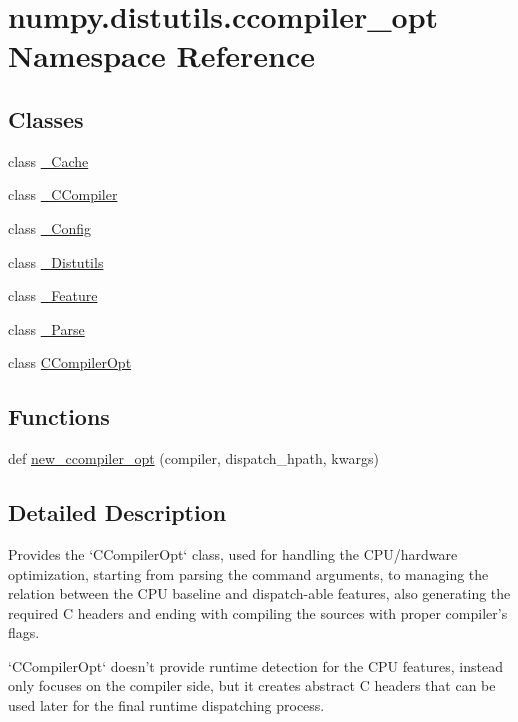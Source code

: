 \hypertarget{namespacenumpy_1_1distutils_1_1ccompiler__opt}{}\section{numpy.\+distutils.\+ccompiler\+\_\+opt Namespace Reference}
\label{namespacenumpy_1_1distutils_1_1ccompiler__opt}
\subsection*{Classes}
\begin{DoxyCompactItemize}
\item 
class \hyperlink{classnumpy_1_1distutils_1_1ccompiler__opt_1_1__Cache}{\+\_\+\+Cache}
\item 
class \hyperlink{classnumpy_1_1distutils_1_1ccompiler__opt_1_1__CCompiler}{\+\_\+\+C\+Compiler}
\item 
class \hyperlink{classnumpy_1_1distutils_1_1ccompiler__opt_1_1__Config}{\+\_\+\+Config}
\item 
class \hyperlink{classnumpy_1_1distutils_1_1ccompiler__opt_1_1__Distutils}{\+\_\+\+Distutils}
\item 
class \hyperlink{classnumpy_1_1distutils_1_1ccompiler__opt_1_1__Feature}{\+\_\+\+Feature}
\item 
class \hyperlink{classnumpy_1_1distutils_1_1ccompiler__opt_1_1__Parse}{\+\_\+\+Parse}
\item 
class \hyperlink{classnumpy_1_1distutils_1_1ccompiler__opt_1_1CCompilerOpt}{C\+Compiler\+Opt}
\end{DoxyCompactItemize}
\subsection*{Functions}
\begin{DoxyCompactItemize}
\item 
def \hyperlink{namespacenumpy_1_1distutils_1_1ccompiler__opt_a0024a946b633d7b74ad51236f7f49569}{new\+\_\+ccompiler\+\_\+opt} (compiler, dispatch\+\_\+hpath, kwargs)
\end{DoxyCompactItemize}


\subsection{Detailed Description}
\begin{DoxyVerb}Provides the `CCompilerOpt` class, used for handling the CPU/hardware
optimization, starting from parsing the command arguments, to managing the
relation between the CPU baseline and dispatch-able features,
also generating the required C headers and ending with compiling
the sources with proper compiler's flags.

`CCompilerOpt` doesn't provide runtime detection for the CPU features,
instead only focuses on the compiler side, but it creates abstract C headers
that can be used later for the final runtime dispatching process.\end{DoxyVerb}
 


